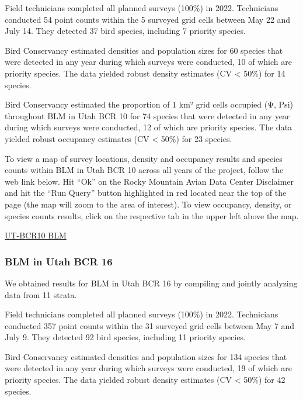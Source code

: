 \documentclass[
  letterpaper,
  DIV=11,
  numbers=noendperiod,
  oneside]{scrreprt}
\begin{document}
Field technicians completed all planned surveys (100\%) in 2022.
Technicians conducted 54 point counts within the 5 surveyed grid cells
between May 22 and July 14. They detected 37 bird species, including 7
priority species.

Bird Conservancy estimated densities and population sizes for 60 species
that were detected in any year during which surveys were conducted, 10
of which are priority species. The data yielded robust density estimates
(CV \textless{} 50\%) for 14 species.

Bird Conservancy estimated the proportion of 1 km² grid cells occupied
(Ψ, Psi) throughout BLM in Utah BCR 10 for 74 species that were detected
in any year during which surveys were conducted, 12 of which are
priority species. The data yielded robust occupancy estimates (CV
\textless{} 50\%) for 23 species.

To view a map of survey locations, density and occupancy results and
species counts within BLM in Utah BCR 10 across all years of the
project, follow the web link below. Hit ``Ok'' on the Rocky Mountain
Avian Data Center Disclaimer and hit the ``Run Query'' button
highlighted in red located near the top of the page (the map will zoom
to the area of interest). To view occupancy, density, or species counts
results, click on the respective tab in the upper left above the map.

\href{http://www.rmbo.org/new_site/adc/QueryWindow.aspx\#N4IgzgrgDgpgTmALnAhoiBbEAuABCAVQBUBaAIQGEAlARgAZcyAZAWRAF8g=}{UT-BCR10
BLM}

\hypertarget{blm-in-utah-bcr-16}{%
\subsubsection{BLM in Utah BCR 16}\label{blm-in-utah-bcr-16}}

We obtained results for BLM in Utah BCR 16 by compiling and jointly
analyzing data from 11 strata.

Field technicians completed all planned surveys (100\%) in 2022.
Technicians conducted 357 point counts within the 31 surveyed grid cells
between May 7 and July 9. They detected 92 bird species, including 11
priority species.

Bird Conservancy estimated densities and population sizes for 134
species that were detected in any year during which surveys were
conducted, 19 of which are priority species. The data yielded robust
density estimates (CV \textless{} 50\%) for 42 species.
\end{document}
